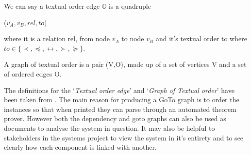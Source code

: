 \begin{defin}
We can say a textual order edge $\mathbb{O}$ is a quadruple
\begin{center}
($v_{A}, v_{B}, rel, to$)
\end{center}
where it is a relation rel, from node $v_{A}$ to node $v_{B}$ and it's textual order to where $to \in \{\prec , \preceq , \leftrightarrow , \succ , \succeq \}$.
\end{defin}

\begin{defin}
A graph of textual order is a pair (V,O), made up of a set of vertices V and a set of ordered edges O.
\end{defin}

The definitions for the `\emph{Textual order edge}' and `\emph{Graph of Textual order}' have been taken from \cite{zengfirstyear}. The main reason for producing a GoTo graph is to order the instances so that when printed they can parse through an automated theorem prover. However both the dependency and goto graphs can also be used as documents to analyse the system in question. It may also be helpful to stakeholders in the systems project to view the system in it's entirety and to see clearly how each component is linked with another.

